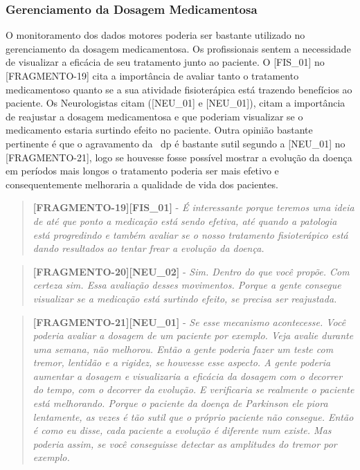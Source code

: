 \subsubsection{Gerenciamento da Dosagem Medicamentosa}
O monitoramento dos dados motores poderia ser bastante utilizado no gerenciamento da dosagem medicamentosa. Os profissionais sentem a necessidade de visualizar a eficácia de seu tratamento junto ao paciente. O [FIS\_01] no [FRAGMENTO-19] cita a importância de avaliar tanto o tratamento medicamentoso quanto se a sua atividade fisioterápica está trazendo benefícios ao paciente. Os Neurologistas citam ([NEU\_01] e [NEU\_01]), citam a importância de reajustar a dosagem medicamentosa e que poderiam visualizar se o medicamento estaria surtindo efeito no paciente. Outra opinião bastante pertinente é que o agravamento da ~\ac{dp} é bastante sutil segundo a [NEU\_01] no [FRAGMENTO-21], logo se houvesse fosse possível mostrar a evolução da doença em períodos mais longos o tratamento poderia ser mais efetivo e consequentemente melhoraria a qualidade de vida dos pacientes.


\begin{quote}
\textbf{[FRAGMENTO-19][FIS\_01]} - 
\emph{
 É interessante porque teremos uma ideia de até que ponto a medicação está sendo efetiva, até quando a patologia está progredindo e também avaliar se o nosso tratamento fisioterápico está dando resultados ao tentar frear a evolução da doença.
}
\end{quote}


\begin{quote}
\textbf{[FRAGMENTO-20][NEU\_02]} - 
\emph{
Sim. Dentro do que você propõe. Com certeza sim. Essa avaliação desses movimentos. Porque a gente consegue visualizar se a medicação está surtindo efeito, se precisa ser reajustada.
}
\end{quote}

\begin{quote}
\textbf{[FRAGMENTO-21][NEU\_01]} - 
\emph{
Se esse mecanismo acontecesse. Você poderia avaliar a dosagem de um paciente por exemplo. Veja avalie durante uma semana, não melhorou. Então a gente poderia fazer um teste com tremor, lentidão e a rigidez, se houvesse esse aspecto.  A gente poderia aumentar a dosagem e visualizaria a eficácia da dosagem com o decorrer do tempo, com o decorrer da evolução. E verificaria se realmente o paciente está melhorando. Porque o paciente da doença de Parkinson ele piora lentamente, as vezes é tão sutil que o próprio paciente não consegue. Então é como eu disse, cada paciente a evolução é diferente num existe. Mas poderia assim, se você conseguisse detectar as amplitudes do tremor por exemplo.
}
\end{quote}






